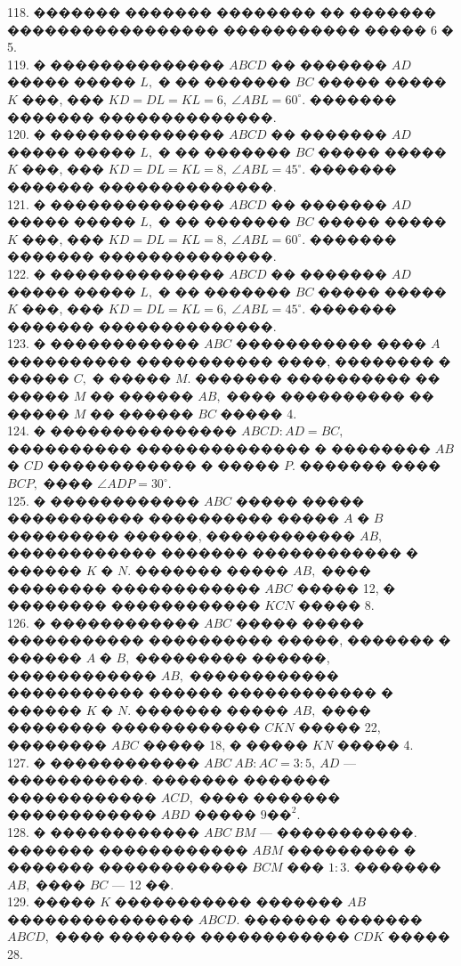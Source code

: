 \documentclass[12pt]{article}
\begin{document}
118. ������� ������� �������� �� ������� ����������������� ����������� ����� 6 � 5.\\
119. � �������������� $ABCD$ �� ������� $AD$ ����� ����� $L,$ � �� ������� $BC$ ����� ����� $K$ ���, ��� $KD=DL=KL=6,\ \angle ABL=60^\circ.$ ������� ������� ��������������.\\
120. � �������������� $ABCD$ �� ������� $AD$ ����� ����� $L,$ � �� ������� $BC$ ����� ����� $K$ ���, ��� $KD=DL=KL=8,\ \angle ABL=45^\circ.$ ������� ������� ��������������.\\
121. � �������������� $ABCD$ �� ������� $AD$ ����� ����� $L,$ � �� ������� $BC$ ����� ����� $K$ ���, ��� $KD=DL=KL=8,\ \angle ABL=60^\circ.$ ������� ������� ��������������.\\
122. � �������������� $ABCD$ �� ������� $AD$ ����� ����� $L,$ � �� ������� $BC$ ����� ����� $K$ ���, ��� $KD=DL=KL=6,\ \angle ABL=45^\circ.$ ������� ������� ��������������.\\
123. � ������������ $ABC$ ����������� ���� $A$ ���������� ����������� ����, �������� � ����� $C,$ � ����� $M.$ ������� ���������� �� ����� $M$ �� ������ $AB,$ ���� ���������� �� ����� $M$ �� ������ $BC$ ����� 4.\\
124. � ��������������� $ABCD: AD=BC,$ ���������� �������������� � �������� $AB$ � $CD$ ������������ � ����� $P.$ ������� ���� $BCP,$ ���� $\angle ADP=30^\circ.$\\
125. � ������������ $ABC$ ����� ����� ����������� ���������� ����� $A$ � $B$ ��������� ������, ������������ $AB,$ ������������ ������� ������������ � ������ $K$ � $N.$ ������� ����� $AB,$ ���� �������� ������������ $ABC$ ����� 12, � �������� ������������ $KCN$ ����� 8.\\
126. � ������������ $ABC$ ����� ����� ����������� ���������� �����, ������� � ������ $A$ � $B,$ ��������� ������, ������������ $AB,$ ������������ ����������� ������ ������������ � ������ $K$ � $N.$ ������� ����� $AB,$ ���� �������� ������������ $CKN$ ����� 22, �������� $ABC$ ����� 18, � ����� $KN$ ����� 4.\\
127. � ������������ $ABC\ AB:AC=3:5,\ AD$ --- �����������. ������� ������� ������������ $ACD,$ ���� ������� ������������ $ABD$ ����� $9\text{��}^2.$\\  128. � ������������ $ABC\ BM$ --- �����������. ������� ������������ $ABM$ ��������� � ������� ������������ $BCM$ ��� $1:3.$ ������� $AB,$ ���� $BC$ --- 12 ��.\\
129. ����� $K$ ����������� ������� $AB$ ��������������� $ABCD.$ ������� ������� $ABCD,$ ���� ������� ������������ $CDK$ ����� 28.\\
\end{document}
